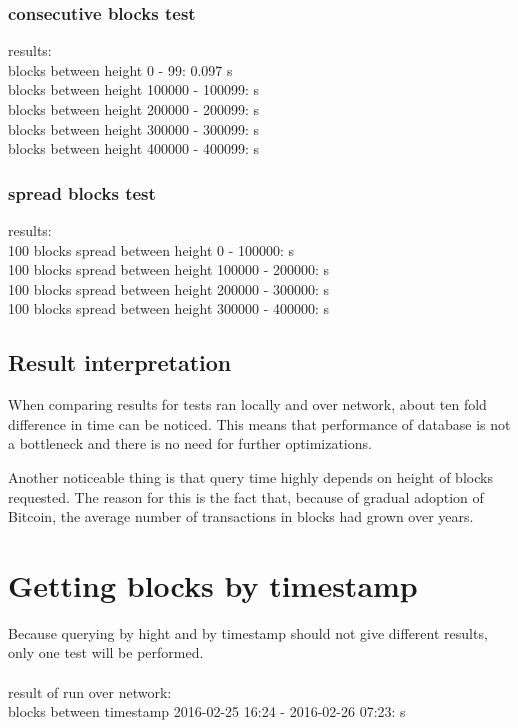 \documentclass[12pt, en, eng, oneside]{mgr}
\begin{document}
\subsubsection{consecutive blocks test}
results:
\\
blocks between height 0 - 99: \quad \quad \quad \hspace*{2em} 0.097 s\\
blocks between height 100000 - 100099:  s\\
blocks between height 200000 - 200099:  s\\
blocks between height 300000 - 300099:  s\\
blocks between height 400000 - 400099:  s\\

\subsubsection{spread blocks test}
results:
\\
100 blocks spread between height 0 - 100000: \quad \quad {} s\\
100 blocks spread between height 100000 - 200000:  s\\
100 blocks spread between height 200000 - 300000:  s\\
100 blocks spread between height 300000 - 400000:  s\\

\subsection{Result interpretation}
When comparing results for tests ran locally and over network, about ten fold difference in time can be noticed. This means that performance of database is not a bottleneck and there is no need for further optimizations.

Another noticeable thing is that query time highly depends on height of blocks requested. The reason for this is the fact that, because of gradual adoption of Bitcoin, the average number of transactions in blocks had grown over years. 

\section{Getting blocks by timestamp}
Because querying by hight and by timestamp should not give different results, only one test will be performed.
\\
\\
result of run over network:
\\
blocks between timestamp 2016-02-25 16:24 - 2016-02-26 07:23:  s
\end{document}

